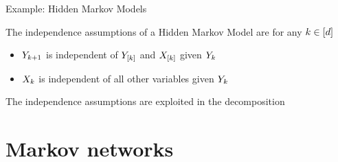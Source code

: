 \documentclass{beamer}
\begin{document}
    \begin{frame}{Example: Hidden Markov Models}

        \medskip
        The independence assumptions of a Hidden Markov Model are for any $k\in[d]$
        \begin{itemize}
            \item $Y_{k+1}$ is independent of $Y_{[k]}$ and $X_{[k]}$ given $Y_{k}$
            \item $X_{k}$ is independent of all other variables given $Y_{k}$
        \end{itemize}
        \medskip
        The independence assumptions are exploited in the decomposition
        \begin{center}
            
        \end{center}

    \end{frame}


    \section{Markov networks}
\end{document}
